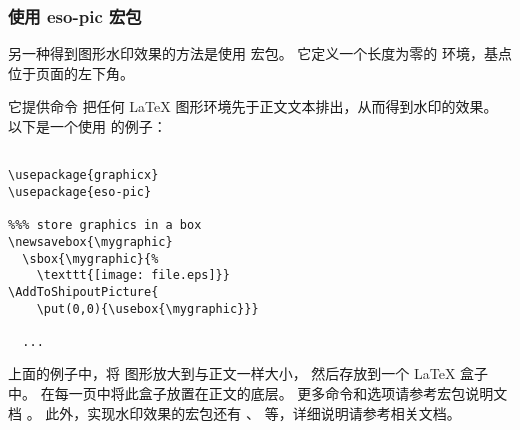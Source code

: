 \subsubsection{使用 eso-pic 宏包}\label{sssec:esopic}

另一种得到图形水印效果的方法是使用  宏包。
它定义一个长度为零的  环境，基点位于页面的左下角。

它提供命令  把任何 \LaTeX{} 图形环境先于正文文本排出，从而得到水印的效果。
以下是一个使用  的例子：

\begin{lstlisting}

\usepackage{graphicx}
\usepackage{eso-pic}

%%% store graphics in a box
\newsavebox{\mygraphic}
  \sbox{\mygraphic}{%
    \texttt{[image: file.eps]}}
\AddToShipoutPicture{
    \put(0,0){\usebox{\mygraphic}}}

  ...

\end{lstlisting}

上面的例子中，将  图形放大到与正文一样大小，
然后存放到一个 \LaTeX{} 盒子中。
在每一页中将此盒子放置在正文的底层。
更多命令和选项请参考宏包说明文档 \cite{eso-pic-doc}。
此外，实现水印效果的宏包还有  \cite{background-doc}、 \cite{xwatermark-doc} 等，详细说明请参考相关文档。

\endinput
